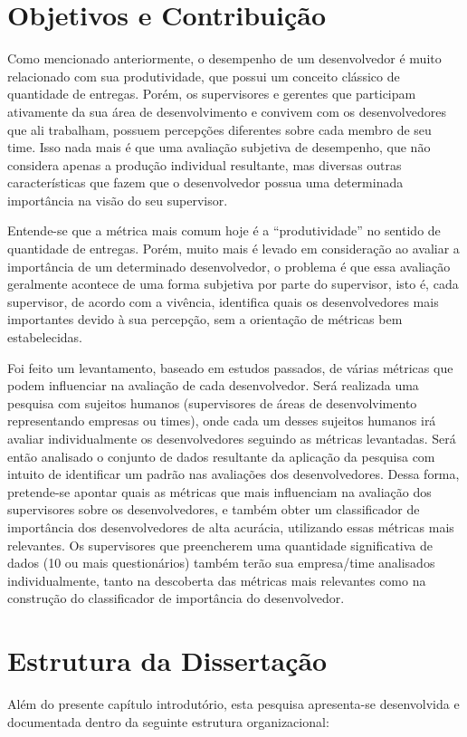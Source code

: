 \section{Objetivos e Contribuição}
Como mencionado anteriormente, o desempenho de um desenvolvedor é muito relacionado com sua produtividade, que possui um conceito clássico de quantidade de entregas. Porém, os supervisores e gerentes que participam ativamente da sua área de desenvolvimento e convivem com os desenvolvedores que ali trabalham, possuem percepções diferentes sobre cada membro de seu time. Isso nada mais é que uma avaliação subjetiva de desempenho, que não considera apenas a produção individual resultante, mas diversas outras características que fazem que o desenvolvedor possua uma determinada importância na visão do seu supervisor.

Entende-se que a métrica mais comum hoje é a “produtividade” no sentido de quantidade de entregas. Porém, muito mais é levado em consideração ao avaliar a importância de um determinado desenvolvedor, o problema é que essa avaliação geralmente acontece de uma forma subjetiva por parte do supervisor, isto é, cada supervisor, de acordo com a vivência, identifica quais os desenvolvedores mais importantes devido à sua percepção, sem a orientação de métricas bem estabelecidas.

Foi feito um levantamento, baseado em estudos passados, de várias métricas que podem influenciar na avaliação de cada desenvolvedor. Será realizada uma pesquisa com sujeitos humanos (supervisores de áreas de desenvolvimento representando empresas ou times), onde cada um desses sujeitos humanos irá avaliar individualmente os desenvolvedores seguindo as métricas levantadas. Será então analisado o conjunto de dados resultante da aplicação da pesquisa com intuito de identificar um padrão nas avaliações dos desenvolvedores. Dessa forma, pretende-se apontar quais as métricas que mais influenciam na avaliação dos supervisores sobre os desenvolvedores, e também obter um classificador de importância dos desenvolvedores de alta acurácia, utilizando essas métricas mais relevantes. Os supervisores que preencherem uma quantidade significativa de dados (10 ou mais questionários) também terão sua empresa/time analisados individualmente, tanto na descoberta das métricas mais relevantes como na construção do classificador de importância do desenvolvedor.


\section{Estrutura da Dissertação}
Além do presente capítulo introdutório, esta pesquisa apresenta-se desenvolvida e documentada dentro da seguinte estrutura organizacional:

